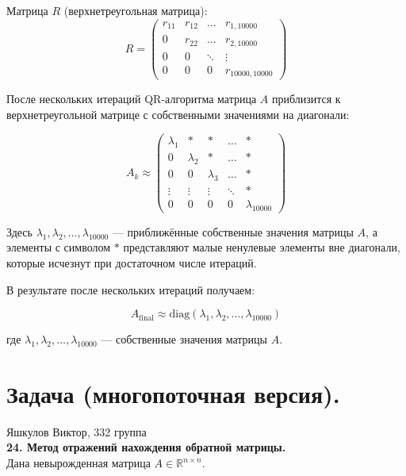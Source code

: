 \documentclass[14pt]{report}
\begin{document}
Матрица \( R \) (верхнетреугольная матрица):
\[
R = \begin{pmatrix}
r_{11} & r_{12} & \dots & r_{1,10000} \\
0 & r_{22} & \dots & r_{2,10000} \\
0 & 0 & \ddots & \vdots \\
0 & 0 & 0 & r_{10000,10000}
\end{pmatrix}
\]

После нескольких итераций QR-алгоритма матрица \( A \) приблизится к верхнетреугольной матрице с собственными значениями на диагонали:

\[
A_{k} \approx \begin{pmatrix}
\lambda_1 & * & * & \dots & * \\
0 & \lambda_2 & * & \dots & * \\
0 & 0 & \lambda_3 & \dots & * \\
\vdots & \vdots & \vdots & \ddots & * \\
0 & 0 & 0 & 0 & \lambda_{10000}
\end{pmatrix}
\]

Здесь \( \lambda_1, \lambda_2, \dots, \lambda_{10000} \) — приближённые собственные значения матрицы \( A \), а элементы с символом \( * \) представляют малые ненулевые элементы вне диагонали, которые исчезнут при достаточном числе итераций.

В результате после нескольких итераций получаем:

\[
A_{\text{final}} \approx \text{diag}(\lambda_1, \lambda_2, \dots, \lambda_{10000})
\]

где \( \lambda_1, \lambda_2, \dots, \lambda_{10000} \) — собственные значения матрицы \( A \).
\newpage

\section*{Задача (многопоточная версия).}
\hfill Яшкулов Виктор, 332 группа\\

\textbf{24. Метод отражений нахождения обратной матрицы.} \\ 

Дана невырожденная матрица \( A \in \mathbb{R}^{n \times n} \).
\end{document}
